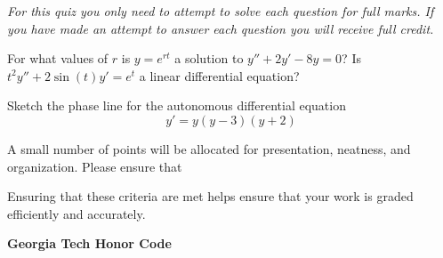 \documentclass[12pt]{exam}
\begin{document}
    


\newpage

\textit{For this quiz you only need to attempt to solve each question for full marks. If you have made an attempt to answer each question you will receive full credit. 
}
\begin{questions}

    \question[1] For what values of $r$ is $y=e^{rt}$ a solution to $y''+2y'-8y=0$? 
    \vspace{10cm} 
    \question[1] Is $t^2y'' + 2\sin(t)y' = e^t$ a linear differential equation? 
    \vspace{2cm}

\newpage 

\question[1] Sketch the phase line for the autonomous differential equation $$y' = y(y-3)(y+2)$$

\vspace{8cm}
    \question[1] A small number of points will be allocated for presentation, neatness, and organization. Please ensure that
    Ensuring that these criteria are met helps ensure that your work is graded efficiently and accurately. 

\end{questions}
\vspace{2cm}
    
    \vspace{6pt}
    \textbf{Georgia Tech Honor Code}\\
    \GTHonorCode
    
\end{document}
